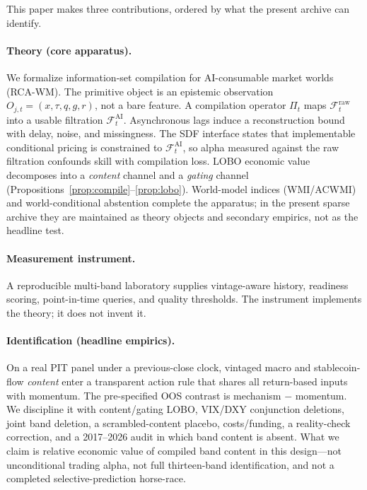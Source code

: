 \documentclass[12pt]{article}
\begin{document}
This paper makes three contributions, ordered by what the present archive can identify.

\paragraph{Theory (core apparatus).}
We formalize information-set compilation for AI-consumable market worlds (RCA-WM). The primitive object is an epistemic observation $O_{j,t}=(x,\tau,q,g,r)$, not a bare feature. A compilation operator $\Pi_t$ maps $\mathcal{F}^{\mathrm{raw}}_t$ into a usable filtration $\mathcal{F}^{\mathrm{AI}}_t$. Asynchronous lags induce a reconstruction bound with delay, noise, and missingness. The SDF interface states that implementable conditional pricing is constrained to $\mathcal{F}^{\mathrm{AI}}_t$, so alpha measured against the raw filtration confounds skill with compilation loss. LOBO economic value decomposes into a \emph{content} channel and a \emph{gating} channel (Propositions~\ref{prop:compile}--\ref{prop:lobo}). World-model indices (WMI/ACWMI) and world-conditional abstention complete the apparatus; in the present sparse archive they are maintained as theory objects and secondary empirics, not as the headline test.

\paragraph{Measurement instrument.}
A reproducible multi-band laboratory supplies vintage-aware history, readiness scoring, point-in-time queries, and quality thresholds. The instrument implements the theory; it does not invent it.

\paragraph{Identification (headline empirics).}
On a real PIT panel under a previous-close clock, vintaged macro and stablecoin-flow \emph{content} enter a transparent action rule that shares all return-based inputs with momentum. The pre-specified OOS contrast is mechanism $-$ momentum. We discipline it with content/gating LOBO, VIX/DXY conjunction deletions, joint band deletion, a scrambled-content placebo, costs/funding, a reality-check correction, and a 2017--2026 audit in which band content is absent. What we claim is relative economic value of compiled band content in this design---not unconditional trading alpha, not full thirteen-band identification, and not a completed selective-prediction horse-race.
\end{document}
